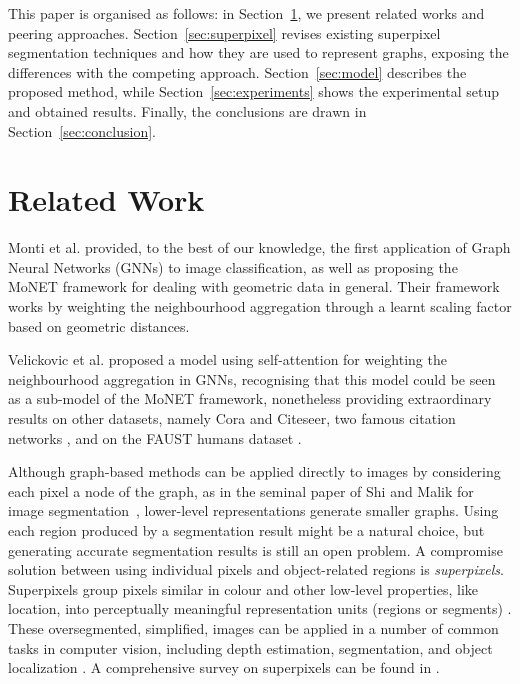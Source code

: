 \documentclass[twocolumn]{article}
\begin{document}
This paper is organised as follows: in Section~\ref{sec:related}, we present related works and peering approaches. Section~\ref{sec:superpixel} revises existing superpixel segmentation techniques and how they are used to represent graphs, exposing the differences with the competing approach. Section~\ref{sec:model} describes the proposed 
method, while Section~\ref{sec:experiments} shows the experimental 
setup and obtained results. Finally, the conclusions are drawn in Section~\ref{sec:conclusion}.

\section{Related Work}\label{sec:related}

Monti et al. \cite{monti2017monet} provided, to the best of our knowledge, the first application of Graph Neural Networks (GNNs) to image classification, as well as proposing the MoNET framework for dealing with geometric data in general. Their framework
works
by weighting the neighbourhood aggregation through a learnt scaling factor based on geometric distances.

Velickovic et al. \cite{velickovic2018gat} proposed a model using self-attention for weighting the neighbourhood aggregation in GNNs, recognising that this model could be seen as a sub-model of the MoNET framework, nonetheless providing extraordinary results on other datasets, namely Cora and Citeseer, two famous citation networks \cite{sen2008collective}, and on the FAUST humans dataset \cite{bogo2014faust}.


Although graph-based methods can be applied directly to images by considering each pixel a node of the graph, as in the seminal paper of Shi and Malik for image segmentation~\cite{shi2000normalized}, lower-level representations generate smaller graphs. Using each region produced by a segmentation result might be a natural choice,
but generating accurate segmentation results is still an open problem. 
A compromise solution between using individual pixels and object-related regions is \textit{superpixels}. 
Superpixels group pixels similar in colour and other low-level properties, like location, into perceptually meaningful representation units (regions or segments) \cite{stutz2018superpixels}. These oversegmented, simplified, images can be applied in a number of common tasks in computer vision, including depth estimation, segmentation, and object localization \cite{achanta2012slic}. A comprehensive survey on superpixels 
can be found in \cite{stutz2018superpixels}.
\end{document}
